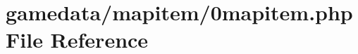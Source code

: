 \hypertarget{0mapitem_8php}{\section{gamedata/mapitem/0mapitem.php File Reference}
\label{0mapitem_8php}
}
